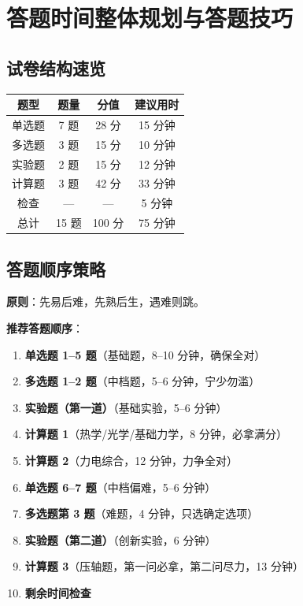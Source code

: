\section{答题时间整体规划与答题技巧}

\subsection{试卷结构速览}

\begin{center}
\begin{tabular}{c|c|c|c}
\textbf{题型} & \textbf{题量} & \textbf{分值} & \textbf{建议用时} \\ \hline
单选题 & 7 题 & 28 分 & 15 分钟 \\
多选题 & 3 题 & 15 分 & 10 分钟 \\
实验题 & 2 题 & 15 分 & 12 分钟 \\
计算题 & 3 题 & 42 分 & 33 分钟 \\
检查 & --- & --- & 5 分钟 \\ \hline
总计 & 15 题 & 100 分 & 75 分钟
\end{tabular}
\end{center}

\subsection{答题顺序策略}

\textbf{原则}：先易后难，先熟后生，遇难则跳。

\textbf{推荐答题顺序}：

\begin{enumerate}
  \item \textbf{单选题 1--5 题}（基础题，8--10 分钟，确保全对）
  \item \textbf{多选题 1--2 题}（中档题，5--6 分钟，宁少勿滥）
  \item \textbf{实验题（第一道）}（基础实验，5--6 分钟）
  \item \textbf{计算题 1}（热学/光学/基础力学，8 分钟，必拿满分）
  \item \textbf{计算题 2}（力电综合，12 分钟，力争全对）
  \item \textbf{单选题 6--7 题}（中档偏难，5--6 分钟）
  \item \textbf{多选题第 3 题}（难题，4 分钟，只选确定选项）
  \item \textbf{实验题（第二道）}（创新实验，6 分钟）
  \item \textbf{计算题 3}（压轴题，第一问必拿，第二问尽力，13 分钟）
  \item \textbf{剩余时间检查}
\end{enumerate}

